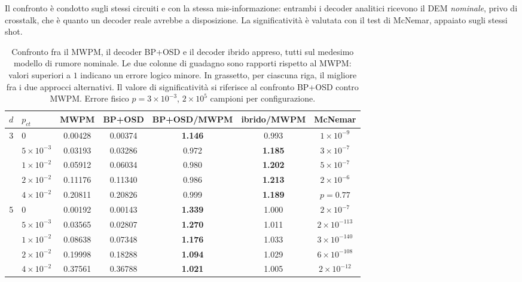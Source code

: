 Il confronto è condotto sugli stessi circuiti e con la stessa mis-informazione: entrambi i decoder analitici ricevono il \ac{DEM} \emph{nominale}, privo di crosstalk, che è quanto un decoder reale avrebbe a disposizione. La significatività è valutata con il test di McNemar, appaiato sugli stessi shot.

\begin{table}[H]
\centering
\scriptsize
\begin{tabular}{clccccc}
\toprule
$d$ & $p_{ct}$ & \textbf{MWPM} & \textbf{BP+OSD} & \textbf{BP+OSD/MWPM} & \textbf{ibrido/MWPM} & \textbf{McNemar} \\
\midrule
\multirow{5}{*}{3} & $0$              & 0.00428 & 0.00374 & \textbf{1.146} & 0.993 & $1\times10^{-9}$ \\
                   & $5\times10^{-3}$ & 0.03193 & 0.03286 & 0.972          & \textbf{1.185} & $3\times10^{-7}$ \\
                   & $1\times10^{-2}$ & 0.05912 & 0.06034 & 0.980          & \textbf{1.202} & $5\times10^{-7}$ \\
                   & $2\times10^{-2}$ & 0.11176 & 0.11340 & 0.986          & \textbf{1.213} & $2\times10^{-6}$ \\
                   & $4\times10^{-2}$ & 0.20811 & 0.20826 & 0.999          & \textbf{1.189} & $p = 0.77$ \\
\midrule
\multirow{5}{*}{5} & $0$              & 0.00192 & 0.00143 & \textbf{1.339} & 1.000 & $2\times10^{-7}$ \\
                   & $5\times10^{-3}$ & 0.03565 & 0.02807 & \textbf{1.270} & 1.011 & $2\times10^{-113}$ \\
                   & $1\times10^{-2}$ & 0.08638 & 0.07348 & \textbf{1.176} & 1.033 & $3\times10^{-140}$ \\
                   & $2\times10^{-2}$ & 0.19998 & 0.18288 & \textbf{1.094} & 1.029 & $6\times10^{-108}$ \\
                   & $4\times10^{-2}$ & 0.37561 & 0.36788 & \textbf{1.021} & 1.005 & $2\times10^{-12}$ \\
\bottomrule
\end{tabular}
\caption[BP+OSD contro MWPM e contro il decoder ibrido]{Confronto fra il \ac{MWPM}, il decoder BP+OSD e il decoder ibrido appreso, tutti sul medesimo modello di rumore nominale. Le due colonne di guadagno sono rapporti rispetto al \ac{MWPM}: valori superiori a $1$ indicano un errore logico minore. In grassetto, per ciascuna riga, il migliore fra i due approcci alternativi. Il valore di significatività si riferisce al confronto BP+OSD contro \ac{MWPM}. Errore fisico $p = 3\times10^{-3}$, $2\times10^{5}$ campioni per configurazione.}
\label{tab:confronto_bposd}
\end{table}

